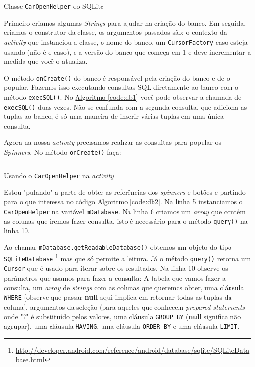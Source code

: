 \documentclass[a4paper,12pt,brazil,oneside]{book}
\begin{document}
\begin{singlespace}
		\begin{listing}[H]
		\inputminted[linenos=true,fontsize=\small,frame=lines, framesep=2mm, tabsize=2,numbersep=5pt]{java}{src/api/storage/db1.java}
		\caption{Classe \texttt{CarOpenHelper} do SQLite}
		\label{code:db1}
		\end{listing} 	

		Primeiro criamos algumas \emph{Strings} para ajudar na criação do banco. Em seguida, criamos o construtor da classe, os argumentos passados são: o contexto da \emph{activity} que instanciou a classe, o nome do banco, um \texttt{CursorFactory} caso esteja usando (não é o caso), e a versão do banco que começa em 1 e deve incrementar a medida que você o atualiza. 
		
		O método \texttt{onCreate()} do banco é responsável pela criação do banco e de o popular. Fazemos isso executando consultas SQL diretamente ao banco com o método \texttt{execSQL()}. No \hyperref[code:db1]{Algoritmo \ref*{code:db1}} você pode observar a chamada de \texttt{execSQL()} duas vezes. Não se confunda com a segunda consulta, que adiciona as tuplas ao banco, é só uma maneira de inserir várias tuplas em uma única consulta.

		Agora na nossa \emph{activity} precisamos realizar as consultas para popular os \emph{Spinners}. No método \texttt{onCreate()} faça: 

		\begin{listing}[H]
		\inputminted[linenos=true,fontsize=\small,frame=lines, framesep=2mm, tabsize=2,numbersep=5pt]{java}{src/api/storage/db2.java}
		\caption{Usando o \texttt{CarOpenHelper} na \emph{activity}}
		\label{code:db2}
		\end{listing} 	

		Estou "pulando" a parte de obter as referências dos \emph{spinners} e botões e partindo para o que interessa no código \hyperref[code:db2]{Algoritmo \ref*{code:db2}}. Na linha 5 instanciamos o \texttt{CarOpenHelper} na variável \texttt{mDatabase}. Na linha 6 criamos um \emph{array} que contém as colunas que iremos fazer consulta, isto é necessário para o método \texttt{query()} na linha 10.

		Ao chamar \texttt{mDatabase.getReadableDatabase()} obtemos um objeto do tipo \\ \texttt{SQLiteDatabase}
\footnote{\href{http://developer.android.com/reference/android/database/sqlite/SQLiteDatabase.html}{http://developer.android.com/reference/android/database/sqlite/SQLiteDatabase.html}}
 mas que só permite a leitura. Já o método \texttt{query()} retorna um \texttt{Cursor} que é usado para iterar sobre os resultados. Na linha 10 observe os parâmetros que usamos para fazer a consulta: A tabela que vamos fazer a consulta, um \emph{array} de \emph{strings} com as colunas que queremos obter,  uma cláusula \texttt{WHERE} (observe que passar \textbf{null} aqui implica em retornar todas as tuplas da coluna), argumentos da seleção (para aqueles que conhecem \emph{prepared statements} onde "?" é substituído pelos valores, uma cláusula \texttt{GROUP BY} (\textbf{null} significa não agrupar), uma cláusula \texttt{HAVING}, uma cláusula \texttt{ORDER BY} e uma cláusula \texttt{LIMIT}.


\end{singlespace}
\end{document}

